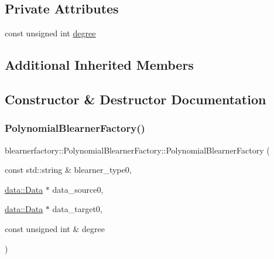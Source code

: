 \subsection*{Private Attributes}
\begin{DoxyCompactItemize}
\item 
const unsigned int \hyperlink{classblearnerfactory_1_1_polynomial_blearner_factory_a78c1852e3f1e1b43e6d8bef40032e19f}{degree}
\end{DoxyCompactItemize}
\subsection*{Additional Inherited Members}


\subsection{Constructor \& Destructor Documentation}
\mbox{\label{classblearnerfactory_1_1_polynomial_blearner_factory_a87a3247a9abe49009e1e951f25ed97cf}} 
\subsubsection{\texorpdfstring{Polynomial\+Blearner\+Factory()}{PolynomialBlearnerFactory()}}
{\footnotesize\ttfamily blearnerfactory\+::\+Polynomial\+Blearner\+Factory\+::\+Polynomial\+Blearner\+Factory (\begin{DoxyParamCaption}\item[{const std\+::string \&}]{blearner\+\_\+type0,  }\item[{\hyperlink{classdata_1_1_data}{data\+::\+Data} $\ast$}]{data\+\_\+source0,  }\item[{\hyperlink{classdata_1_1_data}{data\+::\+Data} $\ast$}]{data\+\_\+target0,  }\item[{const unsigned int \&}]{degree }\end{DoxyParamCaption})}

